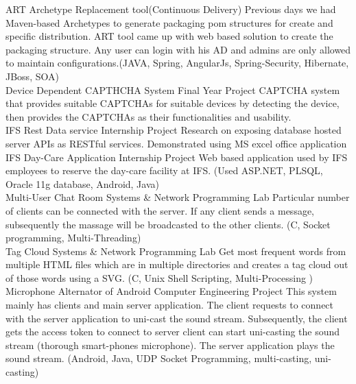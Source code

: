 \documentclass[]{cv-class}
\begin{document}
\begin{entrylist}
\entry
    {}
	{ART}    
    {Archetype Replacement tool(Continuous Delivery)}
{Previous days we had Maven-based Archetypes to generate packaging pom structures for create and specific distribution. ART tool came up with web based solution to create the packaging structure. Any user can login with his AD and admins are only allowed to maintain configurations.(JAVA, Spring, AngularJs, Spring-Security, Hibernate, JBoss, SOA)}
\\
	\entry
    {}
    {Device Dependent CAPTHCHA System}
    {Final Year Project}
    {CAPTCHA system that provides suitable CAPTCHAs for suitable devices
	by  detecting  the  device,  then  provides  the  CAPTCHAs  as  their 
	functionalities and usability.}
	\\
  \entry
    {}
    {IFS Rest Data service}
    {Internship Project}
    {Research on exposing database hosted server  APIs  as  RESTful  services. 
	Demonstrated  using  MS  excel  office  application}
	\\
  \entry
    {}
    {IFS Day-Care Application}
    {Internship Project}
    {Web  based  application  used  by  IFS  employees  to  reserve  the  day-care 
	facility at IFS. (Used ASP.NET, PLSQL, Oracle 11g database, Android, 
	Java)}
	\\  
  \entry
    {}
    {Multi-User Chat Room}
    {Systems \& Network Programming Lab}
    {Particular number of clients can be connected with the server. If any 
	client  sends  a  message, subsequently  the  massage  will be broadcasted to the other clients. 
	(C, Socket programming, Multi-Threading)}
	\\
  \entry
    {}
    {Tag Cloud}
    {Systems \& Network Programming Lab}
    {Get most frequent words from multiple HTML files which are in 
	multiple directories and creates a tag cloud out of those words using a 
	SVG. (C, Unix Shell Scripting, Multi-Processing )}
	\\
  \entry
    {}
    {Microphone Alternator of Android}
    {Computer Engineering Project}
    {This system mainly has clients and main server application. The client requests to connect with the server application to 			uni-cast the sound stream. Subsequently, the client gets the access token to connect to server client can start uni-casting 			the sound stream (thorough smart-phones microphone). The server application plays the sound stream.  
    (Android, Java, UDP Socket Programming, multi-casting, uni-casting)}
\end{entrylist}
\end{document}
